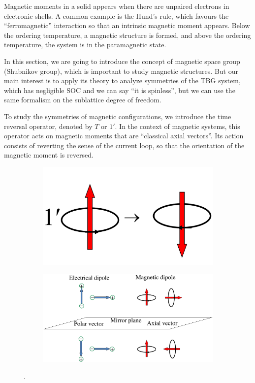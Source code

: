 Magnetic moments in a solid appears when there are unpaired electrons in electronic shells. A common example is the Hund's rule, which favours the ``ferromagnetic'' interaction so that an intrinsic magnetic moment appears. Below the ordering temperature, a magnetic structure is formed, and above the ordering temperature, the system is in the paramagnetic state.

In this section, we are going to introduce the concept of magnetic space group (Shubnikov group), which is important to study magnetic structures. But our main interest is to apply its theory to analyze symmetries of the TBG system, which has negligible SOC and we can say ``it is spinless'', but we can use the same formalism on the sublattice degree of freedom.

To study the symmetries of magnetic configurations, we introduce the time reversal operator, denoted by $T$ or $1'$. In the context of magnetic systems, this operator acts on magnetic moments that are ``classical axial vectors''. Its action consists of reverting the sense of the current loop, so that the orientation of the magnetic moment is reversed.

\begin{figure}[H]
\centering
\begin{subfigure}{.4\textwidth}
  \centering
  \includegraphics[height=0.4\linewidth]{fig/timerev.png}
  \caption{}
  \label{fig:timerev}
\end{subfigure}%
\begin{subfigure}{.6\textwidth}
  \centering
  \includegraphics[width=\linewidth]{fig/axialvec.png}
  \caption{}
  \label{fig:axialvec}
\end{subfigure}
\caption{.}
\label{fig:geometry}
\end{figure}

